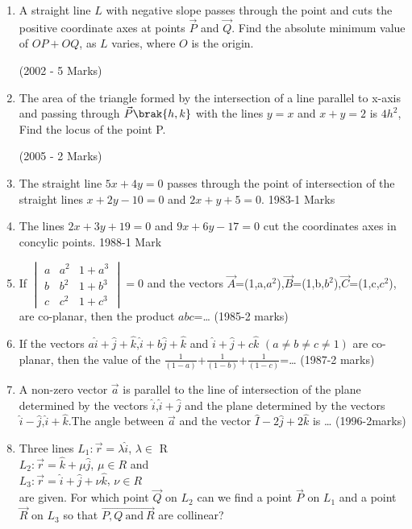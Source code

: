 \begin{enumerate}
\item A straight line $L$ with negative slope passes through the 
point  and cuts the positive coordinate axes at points 
		$\vec{P}$ and $\vec{Q}$. Find the absolute minimum value of $OP + OQ$, as $L$ 
varies, where $O$ is the origin.

\hfill{(2002 - 5 Marks)}

\item The area of the triangle formed by the intersection of a line 
	parallel to x-axis and passing through $\vec{P}\brak{h, k}$ with the lines 
$y=x$ and $x+y=2$ is $4h^{2}$, Find the locus of the point P.

\hfill{(2005 - 2 Marks)}
    \item The straight line $5x+4y=0$ passes through the point of intersection of the straight lines $x+2y-10=0$ and $2x+y+5=0$.
    \hfill{1983-1 Marks}
    \item The lines $2x+3y+19=0$ and $9x+6y-17=0$ cut the coordinates axes in concylic points.
    \hfill{1988-1 Mark}
    \item If $ 
 \begin{vmatrix}
a & a^2 & 1+a^3\\
b & b^2 & 1+b^3\\
c & c^2 & 1+c^3
\end{vmatrix}
=0$ and the vectors $\vec{A}$=(1,a,$a^2$),$\vec{B}$=(1,b,$b^2$),$\vec{C}$=(1,c,$c^2$), are co-planar, then the product $abc$=\dots
\hfill{(1985-2 marks)}
\item If the vectors $a\hat{i}+\hat{j}+\hat{k}$,$\hat{i}+b\hat{j}+\hat{k}$ and $\hat{i}+\hat{j}+c\hat{k}$ $(a\neq b\neq c\neq 1)$ are co-planar, then the value of the $\frac{1}{(1-a)}$+$\frac{1}{(1-b)}$+$\frac{1}{(1-c)}$=\dots
\hfill{(1987-2 marks)}
\item A non-zero vector $\vec{a}$ is parallel to the line of intersection of the plane determined by the vectors $\hat{i}$,$\hat{i}+\hat{j}$ and the plane determined by the vectors $\hat{i}-\hat{j}$,$\hat{i}+\hat{k}$.The angle between $\vec{a}$ and the vector $\hat{I}-2\hat{j}+2\hat{k}$ is \dots
\hfill{(1996-2marks)}
\item %
	Three lines $L_1:\vec{r}=\lambda\hat{i}$, $\lambda\in$ R\\
		$L_2:\vec{r}=\hat{k}+\mu\hat{j}$, $\mu\in R$ and\\
		$L_3:\vec{r}=\hat{i}+\hat{j}+\nu\hat{k}$, $\nu\in R$\\
		are given. For which point $\vec{Q}$ on $L_2$ can we find a point $\vec{P}$ on $L_1$ and a point $\vec{R}$ on $L_3$ so that $\vec{P,Q\ \text{and}\ R}$ are collinear? \hfill{}\\

\end{enumerate}
